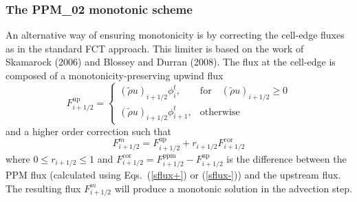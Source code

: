   \subsubsection{The PPM\_02 monotonic scheme}  

  An alternative way of ensuring monotonicity is by correcting the
  cell-edge fluxes as in the standard FCT approach. This limiter is
  based on the work of Skamarock (2006) and Blossey and Durran
  (2008). The flux at the cell-edge is composed of a
  monotonicity-preserving upwind flux
  \begin{equation}
    F^{\mathrm{up}}_{i+1/2} = \left\{ \begin{array}{ll}
    (\tilde{\rho} u)_{i+1/2} \phi^{t}_{i}, & \mathrm{for} \quad (\tilde{\rho} u)_{i+1/2}
    \ge 0 \\
    (\tilde{\rho} u)_{i+1/2} \phi^{t}_{i+1}, & \mathrm{otherwise} 
    \end{array}\right.
  \end{equation}
  and a higher order correction such that
  \begin{equation}
    F^{m}_{i+1/2} = F^{\mathrm{up}}_{i+1/2} + r_{i+1/2}F^{\mathrm{cor}}_{i+1/2}
  \end{equation}
  where $0 \le r_{i+1/2} \le 1$ and $F^{\mathrm{cor}}_{i+1/2} =
  F^{\mathrm{ppm}}_{i+1/2} - F^{\mathrm{up}}_{i+1/2}$ is the difference
  between the PPM flux (calculated using Eqs.~(\ref{sflux+}) or
  (\ref{sflux-})) and the upstream flux. The resulting flux
  $F^{m}_{i+1/2}$ will produce a monotonic solution in the advection step.

